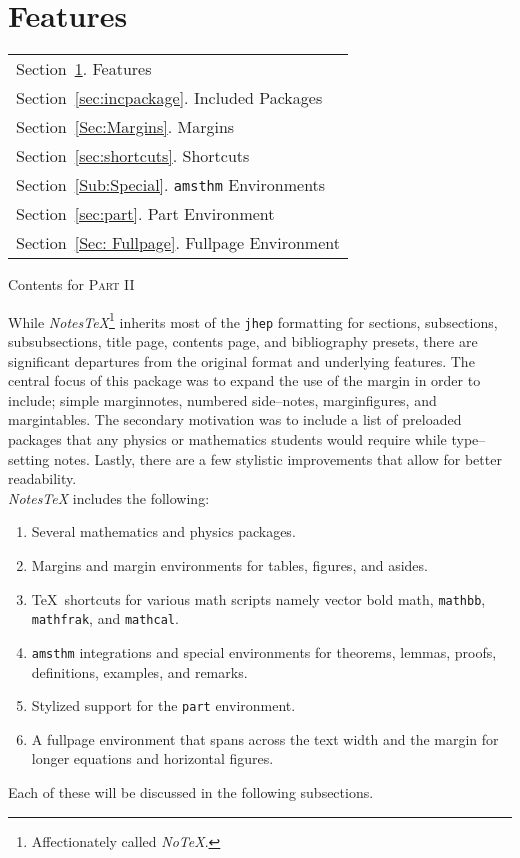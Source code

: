 \documentclass[10pt]{article}
\begin{document}
	\section{Features}\label{sec:Features}
	\begin{margintable}\vspace{1.4in}\footnotesize
		\begin{tabularx}{\marginparwidth}{|X}
		Section~\ref{sec:Features}. Features\\
		Section~\ref{sec:incpackage}. Included Packages\\
		Section~\ref{Sec:Margins}. Margins\\
		Section~\ref{sec:shortcuts}.  Shortcuts\\
		Section~\ref{Sub:Special}. \texttt{amsthm} Environments\\
		Section~\ref{sec:part}. Part Environment\\
		Section~\ref{Sec: Fullpage}. Fullpage Environment\\
		\end{tabularx}
		\caption{Contents for \textsc{Part II}}
	\end{margintable}
	While \textit{NotesTeX}\footnote{Affectionately called \textit{NoTeX}.} inherits most of the \texttt{jhep} formatting for sections, subsections, subsubsections, title page, contents page, and bibliography presets, there are significant departures from the original format and underlying features. The central focus of this package was to expand the use of the margin in order to include; simple marginnotes, numbered side--notes, marginfigures, and margintables. The secondary motivation was to include a list of preloaded packages that any physics or mathematics students would require while type--setting notes. Lastly, there are a few stylistic improvements that allow for better readability.\\

	\noindent \textit{NotesTeX} includes the following:
	\begin{enumerate}
		\item Several mathematics and physics packages.
		\item Margins and margin environments for tables, figures, and asides.
		\item \TeX\ shortcuts for various math scripts namely vector bold math, \texttt{mathbb}, \texttt{mathfrak}, and \texttt{mathcal}.
		\item \texttt{amsthm} integrations and special environments for theorems, lemmas, proofs, definitions, examples, and remarks.\
		\item Stylized support for the \texttt{part} environment.
		\item A fullpage environment that spans across the text width and the margin for longer equations and horizontal figures.
	\end{enumerate}
	Each of these will be discussed in the following subsections.
\end{document}
